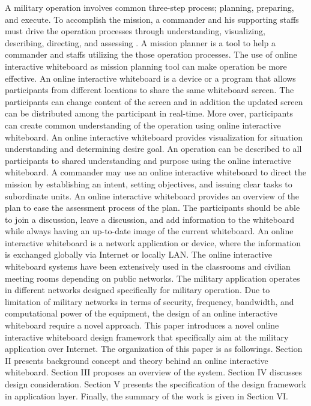 \documentclass[conference]{IEEEtran}
\begin{document}
A military operation involves common three-step process; planning, preparing, and execute. 
To accomplish the mission, a commander and his supporting staffs must drive the operation processes through understanding, visualizing, describing, directing, and assessing \cite{AA}. 
A mission planner is a tool to help a commander and staffs utilizing the those operation processes. 
The use of online interactive whiteboard as mission planning tool can make operation be more effective. 
An online interactive whiteboard is a device or a program that allows participants from different locations to share the same whiteboard screen. 
The participants can change content of the screen and in addition the updated screen can be distributed among the participant in real-time.  
More over, participants can create common understanding of the operation using online interactive whiteboard. 
An online interactive whiteboard provides visualization for situation understanding and determining desire goal. 
An operation can be described to all participants to shared understanding and purpose using the online interactive whiteboard. 
A commander may use an online interactive whiteboard to direct the mission by establishing an intent, setting objectives, and issuing clear tasks to subordinate units. 
An online interactive whiteboard provides an overview of the plan to ease the assessment process of the plan. 
The participants should be able to join a discussion, leave a discussion, and add information to the whiteboard while always having an up-to-date image of the current whiteboard. 
An online interactive whiteboard is a network application or device, where the information is exchanged globally via Internet or locally LAN. 
The online interactive whiteboard systems have been extensively used in the classrooms and civilian meeting rooms depending on public networks. 
The military application operates in different networks designed specifically for military operation. 
Due to limitation of military networks in terms of security, frequency, bandwidth, and computational power of the equipment, the design of an online interactive whiteboard require a novel approach.
This paper introduces a novel online interactive whiteboard design framework that specifically aim at the military application over Internet. 
The organization of this paper is as followings. Section II presents background concept and theory behind an online interactive whiteboard. Section III proposes an overview of the system. Section IV discusses design consideration. Section V presents the specification of the design framework in application layer. Finally, the summary of the work is given in Section VI.
\end{document}
